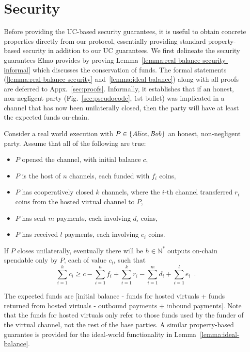 \section{Security}
  \label{section:security}
    Before providing the UC-based security guarantees, it is useful to obtain
  concrete properties directly from our protocol, essentially providing standard
  property-based security in addition to our UC guarantees. We first delineate the
  security guarantees Elmo provides by proving
  Lemma~\ref{lemma:real-balance-security-informal} which discusses the
  conservation of funds. The formal statements
  (\ref{lemma:real-balance-security} and~\ref{lemma:ideal-balance}) along with
  all proofs are deferred
  to Appx.~\ref{sec:proofs}. Informally, it
  establishes that if an honest, non-negligent party (Fig.~\ref{sec:pseudocode},
  $1$st bullet) was implicated in a channel
  that has now been unilaterally closed,
  then the party will have at least the expected funds on-chain.

\begin{lemma}
\label{lemma:real-balance-security-informal}
  Consider a real world execution with $P \in \{\mathit{Alice}, \mathit{Bob}\}$ an honest,
  non-negligent party. Assume that all of the following are true:
  \begin{itemize}
    \item $P$ opened the channel, with initial balance $c$,
    \item $P$ is the host of $n$ channels, each funded with $f_i$ coins,
    \item $P$ has cooperatively closed $k$ channels, where the $i$-th channel
    transferred $r_i$ coins from the hosted virtual channel to $P$,
    \item $P$ has sent $m$ payments, each involving $d_i$ coins,
    \item $P$ has received $l$ payments, each involving $e_i$ coins.
  \end{itemize}
  If $P$ closes unilaterally, eventually there will be $h \in \mathbb{N}^*$ outputs on-chain
  spendable only by $P$, each of value $c_i$, such that
  \begin{equation}
    \sum\limits_{i=1}^h c_i \geq c - \sum\limits_{i=1}^n f_i +
    \sum\limits_{i=1}^k r_i - \sum\limits_{i=1}^m d_i + \sum\limits_{i=1}^l e_i
    \enspace.
  \end{equation}
\end{lemma}

  The expected funds are [initial balance - funds for hosted
  virtuals + funds returned from hosted virtuals - outbound payments + inbound
  payments]. Note that the funds for hosted virtuals only refer to those funds
  used by the funder of the virtual channel, not the rest of the base parties. A
  similar property-based guarantee is provided for the ideal-world functionality
  \fchan in Lemma~\ref{lemma:ideal-balance}.


